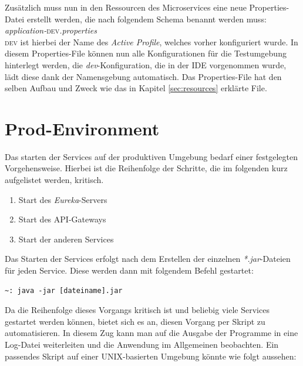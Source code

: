 Zusätzlich muss nun in den Ressourcen des Microservices eine neue Properties-Datei erstellt werden, die nach folgendem Schema benannt werden muss:\\
\textit{application-}\textsc{dev}\textit{.properties}\\
\textsc{dev} ist hierbei der Name des \textit{Active Profile}, welches vorher konfiguriert wurde. In diesem Properties-File können nun alle Konfigurationen für die Testumgebung hinterlegt werden, die \textit{dev}-Konfiguration, die in der \ac{IDE} vorgenommen wurde, lädt diese dank der Namensgebung automatisch. Das Properties-File hat den selben Aufbau und Zweck wie das in Kapitel \ref{sec:resources} erklärte File.

\section{Prod-Environment}

Das starten der Services auf der produktiven Umgebung bedarf einer festgelegten Vorgehensweise. Hierbei ist die Reihenfolge der Schritte, die im folgenden kurz aufgelistet werden, kritisch.

\begin{enumerate}
\item Start des \textit{Eureka}-Servers
\item Start des \ac{API}-Gateways
\item Start der anderen Services
\end{enumerate}

Das Starten der Services erfolgt nach dem Erstellen der einzelnen \textit{*.jar}-Dateien für jeden Service. Diese werden dann mit folgendem Befehl gestartet:

\begin{lstlisting}[caption={Starten eines \textit{jar}-Files}]
~: java -jar [dateiname].jar
\end{lstlisting}

Da die Reihenfolge dieses Vorgangs kritisch ist und beliebig viele Services gestartet werden können, bietet sich es an, diesen Vorgang per Skript zu automatisieren. In diesem Zug kann man auf die Ausgabe der Programme in eine Log-Datei weiterleiten und die Anwendung im Allgemeinen beobachten. Ein passendes Skript auf einer UNIX-basierten Umgebung könnte wie folgt aussehen:

